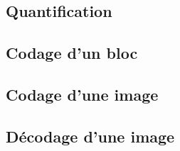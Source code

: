\documentclass[a4paper, 12pt]{article}
\newcommand{\FSource}[1]{%

}
\begin{document}
\FSource{../MyIDCT.m}

\newpage

\subsection{Quantification}\label{quant_code}

\FSource{../QuantM.m}

\newpage

\subsection{Codage d'un bloc}\label{codage_code}

\FSource{../code.m}

\newpage

\subsection{Codage d'une image}\label{codage_image_code}

\FSource{../codJPG.m}

\newpage

\subsection{Décodage d'une image}\label{decodage_image_code}

\FSource{../decJPG.m}

\newpage
\end{document}
